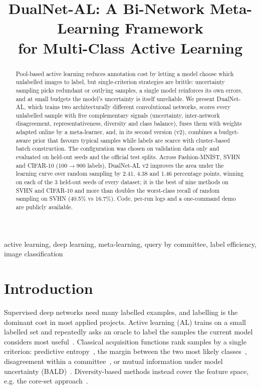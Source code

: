 \documentclass[conference,a4paper]{IEEEtran}
\begin{document}
\title{DualNet-AL: A Bi-Network Meta-Learning Framework\\for Multi-Class Active Learning}
\author{
}
\maketitle

\begin{abstract}
Pool-based active learning reduces annotation cost by letting a model choose which unlabelled images to label, but single-criterion strategies are brittle: uncertainty sampling picks redundant or outlying samples, a single model reinforces its own errors, and at small budgets the model's uncertainty is itself unreliable. We present DualNet-AL, which trains two architecturally different convolutional networks, scores every unlabelled sample with five complementary signals (uncertainty, inter-network disagreement, representativeness, diversity and class balance), fuses them with weights adapted online by a meta-learner, and, in its second version (v2), combines a budget-aware prior that favours typical samples while labels are scarce with cluster-based batch construction. The configuration was chosen on validation data only and evaluated on held-out seeds and the official test splits. Across Fashion-MNIST, SVHN and CIFAR-10 (100$\to$900 labels), DualNet-AL v2 improves the area under the learning curve over random sampling by 2.41, 4.38 and 1.46 percentage points, winning on each of the 3 held-out seeds of every dataset; it is the best of nine methods on SVHN and CIFAR-10 and more than doubles the worst-class recall of random sampling on SVHN (40.5\% vs 16.7\%). Code, per-run logs and a one-command demo are publicly available.
\end{abstract}

\begin{IEEEkeywords}
active learning, deep learning, meta-learning, query by committee, label efficiency, image classification
\end{IEEEkeywords}

\section{Introduction}
Supervised deep networks need many labelled examples, and labelling is the dominant cost in most applied projects.
Active learning (AL) trains on a small labelled set and repeatedly asks an oracle to label the samples the current
model considers most useful~\cite{settles2009}. Classical acquisition functions rank samples by a single criterion:
predictive entropy~\cite{lewis1994}, the margin between the two most likely classes~\cite{scheffer2001},
disagreement within a committee~\cite{seung1992}, or mutual information under model uncertainty
(BALD)~\cite{houlsby2011,gal2017}. Diversity-based methods instead cover the feature space, e.g. the core-set
approach~\cite{sener2018}.
\end{document}

